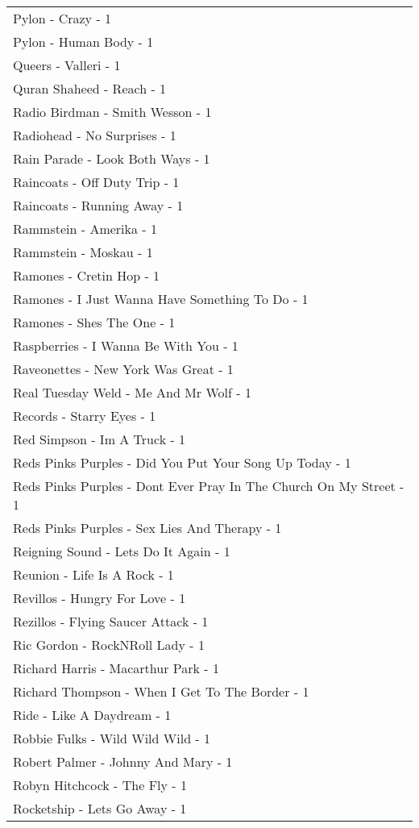 \documentclass[
]{article}
\begin{document}
\begin{longtable}{l}
Pylon - Crazy - 1 \\ 
Pylon - Human Body - 1 \\ 
Queers - Valleri - 1 \\ 
Quran Shaheed - Reach - 1 \\ 
Radio Birdman - Smith Wesson - 1 \\ 
Radiohead - No Surprises - 1 \\ 
Rain Parade - Look Both Ways - 1 \\ 
Raincoats - Off Duty Trip - 1 \\ 
Raincoats - Running Away - 1 \\ 
Rammstein - Amerika - 1 \\ 
Rammstein - Moskau - 1 \\ 
Ramones - Cretin Hop - 1 \\ 
Ramones - I Just Wanna Have Something To Do - 1 \\ 
Ramones - Shes The One - 1 \\ 
Raspberries - I Wanna Be With You - 1 \\ 
Raveonettes - New York Was Great - 1 \\ 
Real Tuesday Weld - Me And Mr Wolf - 1 \\ 
Records - Starry Eyes - 1 \\ 
Red Simpson - Im A Truck - 1 \\ 
Reds Pinks Purples - Did You Put Your Song Up Today - 1 \\ 
Reds Pinks Purples - Dont Ever Pray In The Church On My Street - 1 \\ 
Reds Pinks Purples - Sex Lies And Therapy - 1 \\ 
Reigning Sound - Lets Do It Again - 1 \\ 
Reunion - Life Is A Rock - 1 \\ 
Revillos - Hungry For Love - 1 \\ 
Rezillos - Flying Saucer Attack - 1 \\ 
Ric Gordon - RockNRoll Lady - 1 \\ 
Richard Harris - Macarthur Park - 1 \\ 
Richard Thompson - When I Get To The Border - 1 \\ 
Ride - Like A Daydream - 1 \\ 
Robbie Fulks - Wild Wild Wild - 1 \\ 
Robert Palmer - Johnny And Mary - 1 \\ 
Robyn Hitchcock - The Fly - 1 \\ 
Rocketship - Lets Go Away - 1 \\ 

\end{longtable}
\end{document}
